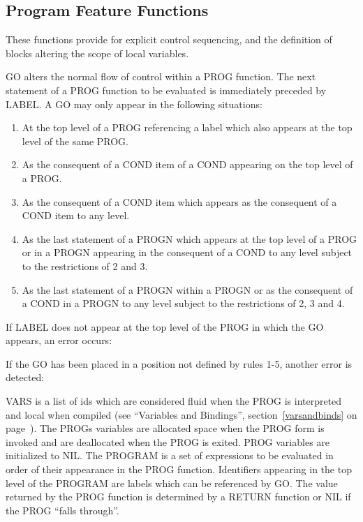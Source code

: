 \subsection{Program Feature Functions}
\label{prog}
These functions provide for explicit control sequencing, and the
definition of blocks altering the scope of local variables.


{GO alters the normal flow of control within a PROG function. The next
statement of a PROG function to be evaluated is immediately preceded
by LABEL. A GO may only appear in the following situations:


\begin{enumerate}
\item At the top level of a PROG referencing a label which also
appears at the top level of the same PROG.

\item As the consequent of a COND item of a COND appearing on the top
level of a PROG.
\item As the consequent of a COND item which appears as the
consequent of a COND item to any level.

\item As the last statement of a PROGN which appears at the top level
of a PROG or in a PROGN appearing in the consequent of a COND to any
level subject to the restrictions of 2 and 3.

\item As the last statement of a PROGN within a PROGN or as the
consequent of a COND in a PROGN to any level subject to the
restrictions of 2, 3 and 4.
\end{enumerate}

If LABEL does not appear at the top level of the PROG in which the GO
appears, an error occurs:


If the GO has been placed in a position not defined by rules 1-5,
another error is detected:

}

{VARS is a list of ids which are considered fluid when the PROG is
interpreted and local when compiled (see ``Variables and Bindings'',
section~\ref{varsandbinds} on page~\pageref{varsandbinds}). The PROGs
variables are allocated space when the PROG form is invoked and are
deallocated when the PROG is exited. PROG variables are initialized to
NIL. The PROGRAM is a set of expressions to be evaluated in order of
their appearance in the PROG function.  Identifiers appearing in the
top level of the PROGRAM are labels which can be referenced by GO. The
value returned by the PROG function is determined by a RETURN function
or NIL if the PROG ``falls through''.}


